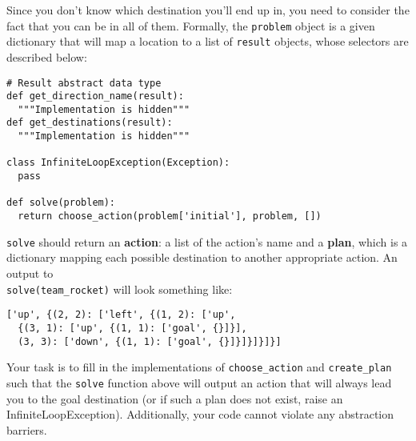 Since you don't know which destination you'll end up in, you need to consider the fact that you can be in all of them. Formally, the {\tt problem} object is a given dictionary that will map a location to a list of {\tt result} objects, whose selectors are described below: 
\begin{lstlisting}
# Result abstract data type
def get_direction_name(result):
  """Implementation is hidden"""
def get_destinations(result):
  """Implementation is hidden"""

class InfiniteLoopException(Exception):
  pass

def solve(problem):
  return choose_action(problem['initial'], problem, [])
\end{lstlisting}

{\tt solve} should return an \textbf{action}: a list of the action's name and a \textbf{plan}, which is a dictionary mapping each possible destination to another appropriate action. An output to 
\\ {\tt solve(team\_rocket)} will look something like:
\begin{lstlisting}
['up', {(2, 2): ['left', {(1, 2): ['up', 
  {(3, 1): ['up', {(1, 1): ['goal', {}]}], 
  (3, 3): ['down', {(1, 1): ['goal', {}]}]}]}]}]
\end{lstlisting}

Your task is to fill in the implementations of {\tt choose\_action} and {\tt create\_plan} such that the {\tt solve} function above will output an action that will always lead you to the goal destination (or if such a plan does not exist, raise an InfiniteLoopException). Additionally, your code cannot violate any abstraction barriers.

